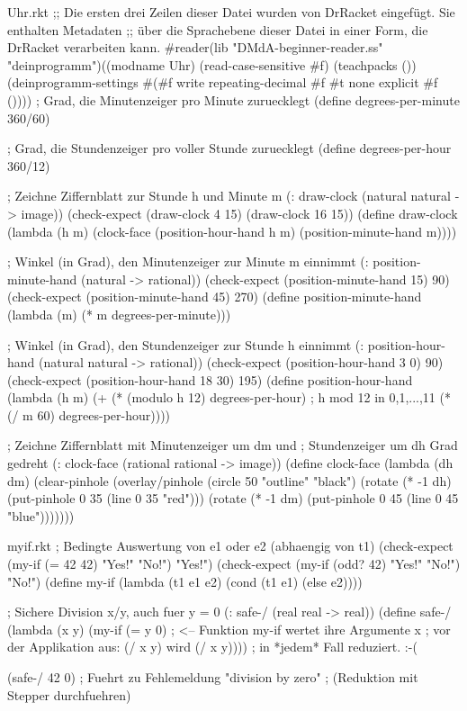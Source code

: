 \begin{filecontents*}{Uhr.rkt}
;; Die ersten drei Zeilen dieser Datei wurden von DrRacket eingefügt. Sie enthalten Metadaten
;; über die Sprachebene dieser Datei in einer Form, die DrRacket verarbeiten kann.
#reader(lib "DMdA-beginner-reader.ss" "deinprogramm")((modname Uhr) (read-case-sensitive #f) (teachpacks ()) (deinprogramm-settings #(#f write repeating-decimal #f #t none explicit #f ())))
; Grad, die Minutenzeiger pro Minute zuruecklegt
(define degrees-per-minute 360/60)

; Grad, die Stundenzeiger pro voller Stunde zuruecklegt
(define degrees-per-hour 360/12)

; Zeichne Ziffernblatt zur Stunde h und Minute m
(: draw-clock (natural natural -> image))
(check-expect (draw-clock 4 15) (draw-clock 16 15))
(define draw-clock
(lambda (h m)
(clock-face (position-hour-hand h m)
(position-minute-hand m))))

; Winkel (in Grad), den Minutenzeiger zur Minute m einnimmt
(: position-minute-hand (natural -> rational))
(check-expect (position-minute-hand 15) 90)
(check-expect (position-minute-hand 45) 270)
(define position-minute-hand
(lambda (m)
(* m degrees-per-minute)))

; Winkel (in Grad), den Stundenzeiger zur Stunde h einnimmt
(: position-hour-hand (natural natural -> rational))
(check-expect (position-hour-hand 3 0) 90)
(check-expect (position-hour-hand 18 30) 195)
(define position-hour-hand
(lambda (h m)
(+ (* (modulo h 12) degrees-per-hour)
; h mod 12 in {0,1,...,11}
(* (/ m 60) degrees-per-hour))))

; Zeichne Ziffernblatt mit Minutenzeiger um dm und
; Stundenzeiger um dh Grad gedreht
(: clock-face (rational rational -> image))
(define clock-face
(lambda (dh dm)
(clear-pinhole
(overlay/pinhole
(circle 50 "outline" "black")
(rotate (* -1 dh) (put-pinhole 0 35 (line 0 35 "red")))
(rotate (* -1 dm) (put-pinhole 0 45 (line 0 45 "blue")))))))

\end{filecontents*}
\begin{filecontents*}{myif.rkt}
; Bedingte Auswertung von e1 oder e2 (abhaengig von t1)
(check-expect (my-if (= 42 42) "Yes!" "No!") "Yes!")
(check-expect (my-if (odd? 42) "Yes!" "No!") "No!")
(define my-if
  (lambda (t1 e1 e2)
    (cond (t1 e1)
          (else e2))))

; Sichere Division x/y, auch fuer y = 0
(: safe-/ (real real -> real))
(define safe-/
  (lambda (x y)
    (my-if (= y 0)     ; <-- Funktion my-if wertet ihre Argumente
           x           ;     vor der Applikation aus: (/ x y) wird
           (/ x y))))  ;     in *jedem* Fall reduziert. :-(


(safe-/ 42 0)          ; Fuehrt zu Fehlemeldung "division by zero"
                       ; (Reduktion mit Stepper durchfuehren)
\end{filecontents*}
